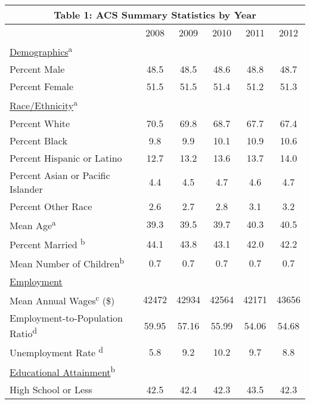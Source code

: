 \documentclass[11pt]{article}
\theoremstyle{definition}
\begin{document}
\vspace{2.5mm}
\noindent
\begin{center}
\begin{tabular}{l c c c c c}
\hline\hline
\multicolumn{6}{c}{\textbf{Table 1: ACS Summary Statistics by Year}} \\
\hline
 & 2008 & 2009 & 2010 & 2011 & 2012 \\
\hline
\underline{Demographics}\textsuperscript{a} &  &  &  &  &  \\
\hspace{2.5mm}Percent Male & 48.5 & 48.5  & 48.6  & 48.8 & 48.7 \\
\hspace{2.5mm}Percent Female & 51.5 & 51.5 & 51.4 & 51.2 & 51.3 \\
\underline{Race/Ethnicity}\textsuperscript{a} &  &  &  &  &  \\
\hspace{2.5mm}Percent White & 70.5 & 69.8  & 68.7 & 67.7 & 67.4 \\
\hspace{2.5mm}Percent Black & 9.8 & 9.9 & 10.1 & 10.9 & 10.6 \\
\hspace{2.5mm}Percent Hispanic or Latino & 12.7 & 13.2 & 13.6 & 13.7 & 14.0 \\
\hspace{2.5mm}Percent Asian or Pacific Islander & 4.4 & 4.5 & 4.7 & 4.6 & 4.7 \\
\hspace{2.5mm}Percent Other Race & 2.6 & 2.7 & 2.8 & 3.1 & 3.2 \\
Mean Age\textsuperscript{a} & 39.3 & 39.5 & 39.7 & 40.3 & 40.5 \\
Percent Married \textsuperscript{b} & 44.1 & 43.8 & 43.1 & 42.0 & 42.2 \\
Mean Number of Children\textsuperscript{b} & 0.7 & 0.7 & 0.7 & 0.7 & 0.7 \\
\underline{Employment} & & & &  &  \\
Mean Annual Wages\textsuperscript{c} (\$) & 42472 & 42934 & 42564 & 42171 & 43656 \\
Employment-to-Population Ratio\textsuperscript{d} & 59.95 & 57.16 & 55.99 & 54.06 & 54.68 \\
Unemployment Rate \textsuperscript{d} & 5.8 & 9.2 & 10.2 & 9.7 & 8.8 \\
\underline{Educational Attainment}\textsuperscript{b}  &  &  &  & \\
High School or Less  & 42.5 & 42.4 & 42.3 & 43.5 & 42.3 \\

\end{tabular}
\end{center}
\end{document}
